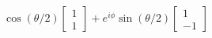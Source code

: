 \documentclass[preview]{standalone}
\begin{document}
\begin{align*}
\cos(\theta/2) \begin{bmatrix} 1 \\ 1\end{bmatrix} + e^{i \phi }\sin(\theta/2) \begin{bmatrix} 1 \\ -1\end{bmatrix}
\end{align*}
\end{document}
